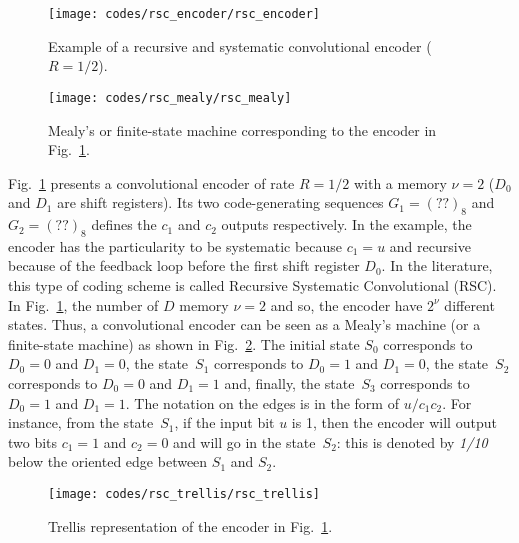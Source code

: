 \begin{figure}[htp]
  \centering
  \texttt{[image: codes/rsc\_encoder/rsc\_encoder]}
  \caption{Example of a recursive and systematic convolutional encoder ($R = 1/2$).}
  \label{fig:ctx_codes_rsc_encoder}
\end{figure}

\begin{figure}[htp]
  \centering
  \texttt{[image: codes/rsc\_mealy/rsc\_mealy]}
  \caption{Mealy's or finite-state machine corresponding to the encoder in
    Fig.~\ref{fig:ctx_codes_rsc_encoder}.}
  \label{fig:ctx_codes_rsc_mealy}
\end{figure}

Fig.~\ref{fig:ctx_codes_rsc_encoder} presents a convolutional encoder of rate
$R = 1/2$ with a memory $\nu = 2$ ($D_0$ and $D_1$ are shift registers). Its two
code-generating sequences $G_1 = (??)_8$ and $G_2 = (??)_8$ defines the $c_1$
and $c_2$ outputs respectively. In the example, the encoder has the
particularity to be systematic because $c_1 = u$ and recursive because of the
feedback loop before the first shift register $D_0$. In the literature, this
type of coding scheme is called Recursive Systematic Convolutional (RSC). In
Fig.~\ref{fig:ctx_codes_rsc_encoder}, the number of $D$ memory $\nu = 2$ and
so, the encoder have $2^\nu$ different states. Thus, a convolutional encoder can
be seen as a Mealy's machine (or a finite-state machine) as shown in
Fig.~\ref{fig:ctx_codes_rsc_mealy}. The initial state $S_0$ corresponds to
$D_0 = 0$ and $D_1 = 0$, the state~$S_1$ corresponds to $D_0 = 1$ and $D_1 = 0$,
the state~$S_2$ corresponds to $D_0 = 0$ and $D_1 = 1$ and, finally, the
state~$S_3$ corresponds to $D_0 = 1$ and $D_1 = 1$. The notation on the edges is
in the form of $u/c_1c_2$. For instance, from the state~$S_1$, if the input bit
$u$ is 1, then the encoder will output two bits $c_1 = 1$ and $c_2 = 0$ and will
go in the state~$S_2$: this is denoted by \emph{1/10} below the oriented edge
between $S_1$ and $S_2$.

\begin{figure}[htp]
  \centering
  \texttt{[image: codes/rsc\_trellis/rsc\_trellis]}
  \caption{Trellis representation of the encoder in
    Fig.~\ref{fig:ctx_codes_rsc_encoder}.}
  \label{fig:ctx_codes_rsc_trellis}
\end{figure}


